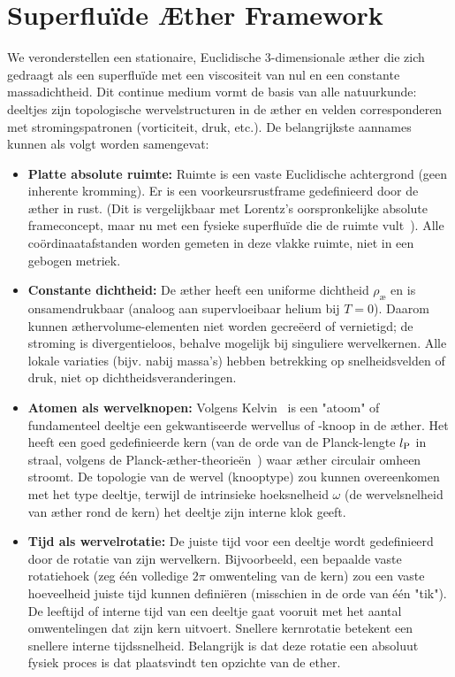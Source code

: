 \section{Superfluïde Æther Framework}

We veronderstellen een stationaire, Euclidische 3-dimensionale æther die zich gedraagt als een superfluïde met een viscositeit van nul en een constante massadichtheid. Dit continue medium vormt de basis van alle natuurkunde: deeltjes zijn topologische wervelstructuren in de æther en velden corresponderen met stromingspatronen (vorticiteit, druk, etc.). De belangrijkste aannames kunnen als volgt worden samengevat:

\begin{itemize}
    \item \textbf{Platte absolute ruimte:} Ruimte is een vaste Euclidische achtergrond (geen inherente kromming). Er is een voorkeursrustframe gedefinieerd door de æther in rust. (Dit is vergelijkbaar met Lorentz's oorspronkelijke absolute frameconcept, maar nu met een fysieke superfluïde die de ruimte vult~\cite{Winterberg2002-PlanckAether}). Alle coördinaatafstanden worden gemeten in deze vlakke ruimte, niet in een gebogen metriek.

    \item \textbf{Constante dichtheid:} De æther heeft een uniforme dichtheid $\rho_{\text{\ae}}$ en is onsamendrukbaar (analoog aan supervloeibaar helium bij $T=0$). Daarom kunnen æthervolume-elementen niet worden gecreëerd of vernietigd; de stroming is divergentieloos, behalve mogelijk bij singuliere wervelkernen. Alle lokale variaties (bijv. nabij massa's) hebben betrekking op snelheidsvelden of druk, niet op dichtheidsveranderingen.

    \item \textbf{Atomen als wervelknopen:} Volgens Kelvin~\cite{Kelvin1867-vortex} is een "atoom" of fundamenteel deeltje een gekwantiseerde wervellus of -knoop in de æther. Het heeft een goed gedefinieerde kern (van de orde van de Planck-lengte $l_{\rm P}$ in straal, volgens de Planck-æther-theorieën~\cite{Winterberg2002-PlanckAether}) waar æther circulair omheen stroomt. De topologie van de wervel (knooptype) zou kunnen overeenkomen met het type deeltje, terwijl de intrinsieke hoeksnelheid $\omega$ (de wervelsnelheid van æther rond de kern) het deeltje zijn interne klok geeft.

    \item \textbf{Tijd als wervelrotatie:} De juiste tijd voor een deeltje wordt gedefinieerd door de rotatie van zijn wervelkern. Bijvoorbeeld, een bepaalde vaste rotatiehoek (zeg één volledige $2\pi$ omwenteling van de kern) zou een vaste hoeveelheid juiste tijd kunnen definiëren (misschien in de orde van één "tik"). De leeftijd of interne tijd van een deeltje gaat vooruit met het aantal omwentelingen dat zijn kern uitvoert. Snellere kernrotatie betekent een snellere interne tijdssnelheid. Belangrijk is dat deze rotatie een absoluut fysiek proces is dat plaatsvindt ten opzichte van de ether.


\end{itemize}
